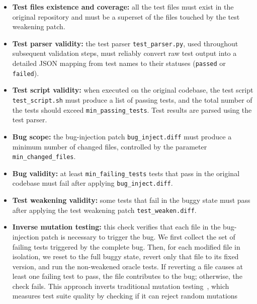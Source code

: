 \begin{itemize}

    \item \textbf{Test files existence and coverage:} all the test files must exist in the original repository and must be a superset of the files touched by the test weakening patch.

    \item \textbf{Test parser validity:} the test parser \texttt{test\_parser.py}, used throughout subsequent validation steps, must reliably convert raw test output into a detailed JSON mapping from test names to their statuses (\texttt{passed} or \texttt{failed}).

    \item \textbf{Test script validity:} when executed on the original codebase, the test script \texttt{test\_script.sh} must produce a list of passing tests, and the total number of the tests should exceed \texttt{min\_passing\_tests}. Test results are parsed using the test parser.

    \item \textbf{Bug scope:} the bug-injection patch \texttt{bug\_inject.diff} must produce a minimum number of changed files, controlled by the parameter \texttt{min\_changed\_files}.

    \item \textbf{Bug validity:} at least \texttt{min\_failing\_tests} tests that pass in the original codebase must fail after applying \texttt{bug\_inject.diff}.

    \item \textbf{Test weakening validity:} some tests that fail in the buggy state must pass after applying the test weakening patch \texttt{test\_weaken.diff}.

    \item \textbf{Inverse mutation testing:} this check verifies that each file in the bug-injection patch is necessary to trigger the bug.
    We first collect the set of failing tests triggered by the complete bug. Then, for each modified file in isolation, we reset to the full buggy state, revert only that file to its fixed version, and run the non-weakened oracle tests.
    If reverting a file causes at least one failing test to pass, the file contributes to the bug; otherwise, the check fails.
    This approach inverts traditional mutation testing~\cite{mutationtesting}, which measures test suite quality by checking if it can reject random mutations
\end{itemize}

